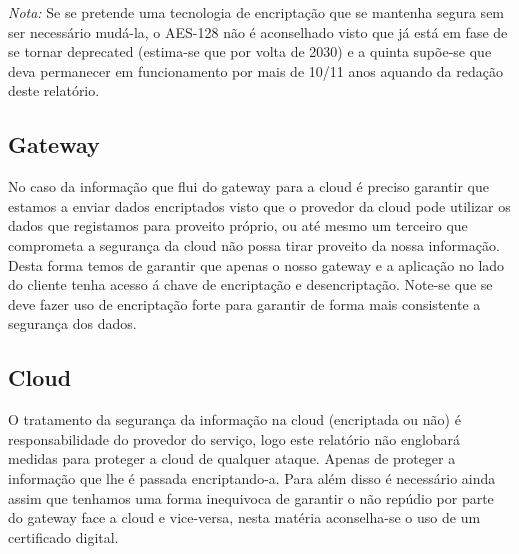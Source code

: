 \textit{Nota:} Se se pretende uma tecnologia de encriptação que se mantenha segura sem ser necessário mudá-la, o AES-128 não é aconselhado visto que já está em fase de se tornar deprecated (estima-se que por volta de 2030) e a quinta supõe-se que deva permanecer em funcionamento por mais de 10/11 anos aquando da redação deste relatório.\newline



\subsection{Gateway}
\par\hfill
\par No caso da informação que flui do gateway para a cloud é preciso garantir que estamos a enviar dados encriptados visto que o provedor da cloud pode utilizar os dados que registamos para proveito próprio, ou até mesmo um terceiro que comprometa a segurança da cloud não possa tirar proveito da nossa informação. Desta forma temos de garantir que apenas o nosso gateway e a aplicação no lado do cliente tenha acesso á chave de encriptação e desencriptação. Note-se que se deve fazer uso de encriptação forte para garantir de forma mais consistente a segurança dos dados.\newline

\subsection{Cloud}
\par\hfill
\par O tratamento da segurança da informação na cloud (encriptada ou não) é responsabilidade do provedor do serviço, logo este relatório não englobará medidas para proteger a cloud de qualquer ataque. Apenas de proteger a informação que lhe é passada encriptando-a.\newline
Para além disso é necessário ainda assim que tenhamos uma forma inequivoca de garantir o não repúdio por parte do gateway face a cloud e vice-versa, nesta matéria aconselha-se o uso de um certificado digital.\newline 
